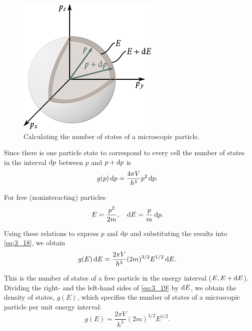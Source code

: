 \begin{figure}[t]
	\begin{center}
		\includegraphics[scale=1]{figures/ch_03/fig_3_1.pdf}
		\caption[]{Calculating the number of states of a microscopic particle.}
		\label{fig:3_1}
	\end{center}
	\vspace{-0.7cm}
\end{figure}

Since there is one particle state to correspond to every cell the number of states in the interval $\mathrm{d} p$ between $p$ and $p+\mathrm{d} p$ is
\begin{equation}\label{eq:3_18}
    g(p)\,\mathrm{d} p = \frac{4\pi V}{h^3}p^2\, \mathrm{d} p.
\end{equation}

For free (noninteracting) particles
\begin{equation*}
    E = \frac{p^2}{2m},\quad \mathrm{d} E = \frac{p}{m}\,\mathrm{d} p.
\end{equation*}

\noindent
Using these relations to express $p$ and $\mathrm{d} p$ and substituting the results into \eqref{eq:3_18}, we obtain
\begin{equation}\label{eq:3_19}
    g(E)\,\mathrm{d} E = \frac{2\pi V}{h^3}(2m)^{3/2} E^{1/2}\, \mathrm{d} E.
\end{equation}

\noindent
This is the number of states of a free particle in the energy interval ($E, E+\mathrm{d} E$). Dividing the right- and the left-hand sides of \eqref{eq:3_19} by $\mathrm{d} E$, we obtain the density of states, $g(E)$, which specifies the number of states of a microscopic particle per unit energy interval:
\begin{equation}\label{eq:3_20}
    g(E) = \frac{2\pi V}{h^3}(2m)^{3/2} E^{1/2}.
\end{equation}

